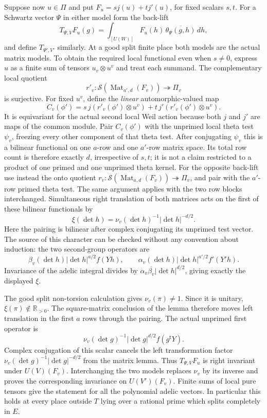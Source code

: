 Suppose now \(u\in\Pi\) and put
\(F_u=sj(u)+tj'(u)\), for fixed scalars \(s,t\). For a Schwartz
vector \(\Psi\) in either model form the back-lift
\[
     T_{\Psi,V}F_u(g)=
         \int_{[U(W)]}F_u(h)\,
                          \overline{\theta_\Psi(g,h)}\,dh ,
\]
and define \(T_{\Psi',V'}\) similarly. At a good split finite
place both models are the actual matrix models. To obtain
the required local functional even when \(s\ne0\), express
\(u\) as a finite sum of tensors \(u_v\otimes u^v\) and treat
each summand. The complementary local quotient
\[
 r'_v:\mathcal S(\operatorname{Mat}_{a',d}(F_v))
                                      \twoheadrightarrow\Pi_v
\]
is surjective. For fixed \(u^v\), define the \emph{linear}
automorphic-valued map
\[
 C_v(\phi')=
    s\,j(r'_v(\phi')\otimes u^v)
           +t\,j'(r'_v(\phi')\otimes u^v).
\]
It is equivariant for the actual second local Weil action
because both \(j\) and \(j'\) are maps of the common module.
Pair \(C_v(\phi')\) with the unprimed local theta test
\(\psi_v\), freezing every other component of that theta
test. After conjugating \(\psi_v\) this is a bilinear
functional on one \(a\)-row and one \(a'\)-row matrix
space. Its total row count is therefore exactly \(d\),
irrespective of \(s,t\); it is not a claim restricted to
a product of one primed and one unprimed theta kernel.
For the opposite back-lift use instead the onto quotient
\(r_v:\mathcal S(\operatorname{Mat}_{a,d}(F_v))
\twoheadrightarrow\Pi_v\), and pair with the \(a'\)-row
primed theta test. The same argument applies with the
two row blocks interchanged.
Simultaneous right translation of both matrices acts
on the first of these bilinear functionals by
\[
                 \xi(\det h)=
                    \nu_v(\det h)^{-1}|\det h|^{-d/2}.
\]
Here the pairing is bilinear after complex conjugating its
unprimed test vector. The source of this character can be
checked without any convention about induction: the two
second-group operators are
\[
 \beta_v(\det h)|\det h|^{a/2}f(Yh),\qquad
 \alpha_v(\det h)|\det h|^{a'/2}f'(Y'h).
\]
Invariance of the adelic integral divides by
\(\alpha_v\overline{\beta_v}|\det h|^{d/2}\), giving exactly
the displayed \(\xi\).

The good split non-torsion calculation gives
\(\nu_v(\pi)\ne1\). Since it is unitary,
\(\xi(\pi)\notin\mathbb R_{>0}\).
The square-matrix conclusion of the lemma therefore moves
left translation in the first \(a\) rows through the pairing.
The actual unprimed first operator is
\[
        \nu_v(\det g)^{-1}|\det g|^{d/2}f(g^{\mathsf t}Y).
\]
Complex conjugation of this scalar cancels the left
transformation factor
\(\nu_v(\det g)^{-1}|\det g|^{-d/2}\) from the matrix lemma.
Thus \(T_{\Psi,V}F_u\) is right invariant under \(U(V)(F_v)\).
Interchanging the two models replaces \(\nu_v\) by its inverse
and proves the corresponding invariance on \(U(V')(F_v)\).
Finite sums of local pure tensors give the statement for all
the polynomial adelic vectors. In particular this holds at
every place outside \(T\) lying over a rational prime which
splits completely in \(E\).

